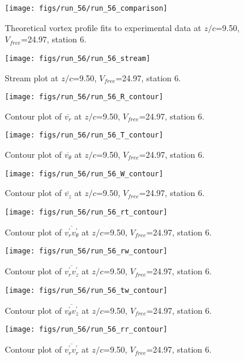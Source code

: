 \begin{figure}[H]
\centering
\texttt{[image: figs/run\_56/run\_56\_comparison]}
\caption{Theoretical vortex profile fits to experimental data at $z/c$=9.50, $V_{free}$=24.97, station 6.}
\end{figure}


\begin{figure}[H]
\centering
\texttt{[image: figs/run\_56/run\_56\_stream]}
\caption{Stream plot at $z/c$=9.50, $V_{free}$=24.97, station 6.}
\end{figure}


\begin{figure}[H]
\centering
\texttt{[image: figs/run\_56/run\_56\_R\_contour]}
\caption{Contour plot of $\overline{v_{r}}$ at $z/c$=9.50, $V_{free}$=24.97, station 6.}
\end{figure}


\begin{figure}[H]
\centering
\texttt{[image: figs/run\_56/run\_56\_T\_contour]}
\caption{Contour plot of $\overline{v_{\theta}}$ at $z/c$=9.50, $V_{free}$=24.97, station 6.}
\end{figure}


\begin{figure}[H]
\centering
\texttt{[image: figs/run\_56/run\_56\_W\_contour]}
\caption{Contour plot of $\overline{v_{z}}$ at $z/c$=9.50, $V_{free}$=24.97, station 6.}
\end{figure}


\begin{figure}[H]
\centering
\texttt{[image: figs/run\_56/run\_56\_rt\_contour]}
\caption{Contour plot of $\overline{v_{r}^{\prime} v_{\theta}^{\prime}}$ at $z/c$=9.50, $V_{free}$=24.97, station 6.}
\end{figure}


\begin{figure}[H]
\centering
\texttt{[image: figs/run\_56/run\_56\_rw\_contour]}
\caption{Contour plot of $\overline{v_{r}^{\prime} v_{z}^{\prime}}$ at $z/c$=9.50, $V_{free}$=24.97, station 6.}
\end{figure}


\begin{figure}[H]
\centering
\texttt{[image: figs/run\_56/run\_56\_tw\_contour]}
\caption{Contour plot of $\overline{v_{\theta}^{\prime} v_{z}^{\prime}}$ at $z/c$=9.50, $V_{free}$=24.97, station 6.}
\end{figure}


\begin{figure}[H]
\centering
\texttt{[image: figs/run\_56/run\_56\_rr\_contour]}
\caption{Contour plot of $\overline{v_{r}^{\prime} v_{r}^{\prime}}$ at $z/c$=9.50, $V_{free}$=24.97, station 6.}
\end{figure}


